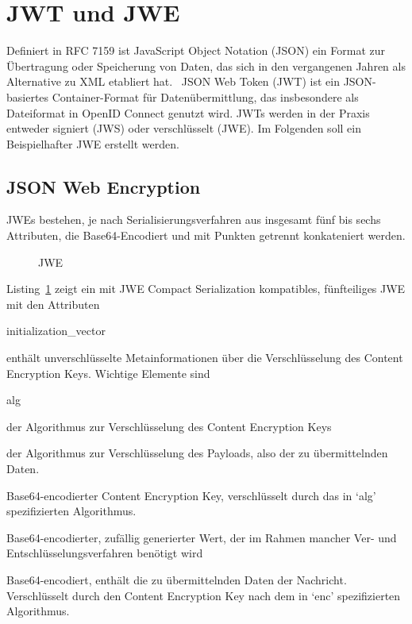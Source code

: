 \section{JWT und JWE}
Definiert in RFC 7159 ist JavaScript Object Notation (JSON) ein Format
zur Übertragung oder Speicherung von Daten, das sich in den vergangenen Jahren
als Alternative zu XML etabliert hat.~
JSON Web Token (JWT) ist ein JSON-basiertes Container-Format für
Datenübermittlung, das insbesondere als Dateiformat in OpenID Connect genutzt
wird. JWTs werden in der Praxis entweder signiert (JWS) oder verschlüsselt
(JWE).
Im Folgenden soll ein Beispielhafter JWE erstellt werden.

\subsection{JSON Web Encryption}
JWEs bestehen, je nach Serialisierungsverfahren aus insgesamt fünf bis sechs
Attributen, die Base64-Encodiert und mit Punkten getrennt konkateniert werden.

\begin{figure}[h]
    \scalebox{.8}{
        
    }
    \caption{JWE}\label{ls: JWE}
\end{figure}

Listing~\ref{ls: JWE} zeigt ein mit JWE Compact Serialization kompatibles,
fünfteiliges JWE mit den Attributen

\begin{labeling}{initialization\_vector}
    \item [header] enthält unverschlüsselte Metainformationen über die
    Verschlüsselung des Content Encryption Keys. Wichtige Elemente sind
    \begin{labeling}{alg}
        \item[alg] der Algorithmus zur Verschlüsselung des Content Encryption
        Keys
        \item[enc] der Algorithmus zur Verschlüsselung des Payloads, also der zu
        übermittelnden Daten.
    \end{labeling}
    \item [encrypted\_key] Base64-encodierter Content Encryption Key,
    verschlüsselt durch das in `alg' spezifizierten Algorithmus.
    \item [initialization\_vector] Base64-encodierter, zufällig generierter
    Wert, der im Rahmen mancher Ver- und Entschlüsselungsverfahren benötigt wird
    \item[ciphertext] Base64-encodiert, enthält die zu übermittelnden Daten der
    Nachricht. Verschlüsselt durch den Content Encryption Key nach dem in `enc'
    spezifizierten Algorithmus.
    \item[tag]
\end{labeling}

